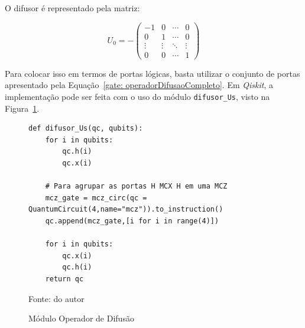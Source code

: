 O difusor é representado pela matriz:

\begin{equation}
U_0 = -
\begin{pmatrix}
-1 & 0 & \cdots & 0 \\
0 & 1 & \cdots & 0 \\
\vdots & \vdots & \ddots & \vdots \\
0 & 0 & \cdots & 1
\end{pmatrix}
\label{mtx: Difusao}
\end{equation}

Para colocar isso em termos de portas lógicas, basta utilizar o conjunto de portas apresentado pela Equação~\ref{gate: operadorDifusaoCompleto}. Em \emph{Qiskit}, a implementação pode ser feita com o uso do módulo \verb|difusor_Us|, visto na Figura~\ref{cod: difusao}.

\begin{figure}[!hb]
\centering
\caption{Módulo Operador de Difusão} 
\begin{verbatim}
def difusor_Us(qc, qubits):
    for i in qubits:
        qc.h(i)
        qc.x(i)

    # Para agrupar as portas H MCX H em uma MCZ
    mcz_gate = mcz_circ(qc = QuantumCircuit(4,name="mcz")).to_instruction() 
    qc.append(mcz_gate,[i for i in range(4)])

    for i in qubits:
        qc.x(i)
        qc.h(i)
    return qc
\end{verbatim} 
{\small Fonte: do autor} 
\label{cod: difusao} 
\end{figure}


